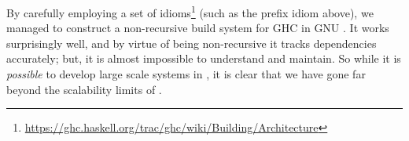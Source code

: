 \noindent
By carefully employing a set of
idioms\footnote{\url{https://ghc.haskell.org/trac/ghc/wiki/Building/Architecture}}
(such as the prefix idiom above), we managed to construct a non-recursive build
system for GHC in GNU \make{}.  It works surprisingly well, and by
virtue of being non-recursive it tracks dependencies accurately;
but, it is almost impossible to understand and maintain.  So while
it is \textit{possible} to develop large scale systems in \make{}, it is
clear that we have gone far beyond the scalability limits of \make{}.


